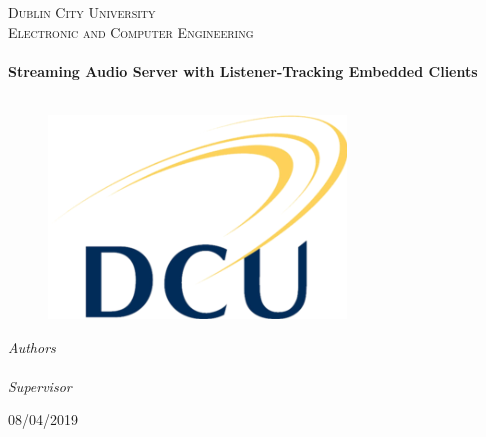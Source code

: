 \begin{titlepage}
  \begin{center}

    \textsc{\LARGE Dublin City University}\\[1.5cm]
    \textsc{\Large Electronic and Computer Engineering}\\[0.5cm]

    \HRule\\[0.4cm]
    {\huge \bfseries Streaming Audio Server with Listener-Tracking Embedded Clients\\[0.4cm]}
    \HRule\\[1.5cm]

    \begin{figure}[H]
	\includegraphics{images/Dcu-logo.png}
	\centering
    \end{figure}

    \emph{Authors}\\[0.1cm]
    \noindent{}\\[0.1cm]

    \emph{Supervisor}
    \noindent{}\\[1cm]

    \vfill

      {\large{08/04/2019}}

  \end{center}
\end{titlepage}
